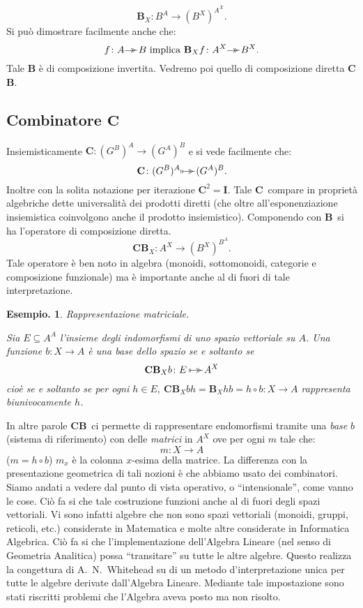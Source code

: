 \documentclass{book}
\newtheorem{esempio}{Esempio.}
\newcommand*{\CC}{$\mathbf{C}$}    %
\newcommand*{\BB}{$\mathbf{B}$}    %
\newcommand*{\ii}{\mathbf{I}}    %
\newcommand*{\cc}{\mathbf{C}}    %
\newcommand*{\bb}{\mathbf{B}}    %
\def\ddp{\hbox{\kern-.5em\lower.63ex\hbox{${}^\succ$}}}
\def\bijection{\mbox{$\mapstochar\,\mapsto\ddp$}}
\def\surjection{\mbox{$\to\ddp$}}
\begin{document}
\[
\bb_X \colon B^A \to (B^X)^{A^X}.
\]
Si pu\`o dimostrare facilmente anche che:
\[
f \colon A \surjection B \text{ implica } \bb_X f \colon A^X \surjection B^X.
\]
Tale $\bb$ \`e di composizione invertita. Vedremo poi quello di composizione
diretta \CC\BB.

\subsection{Combinatore \CC}
Insiemisticamente $\cc \colon (G^B)^{A} \to (G^A)^B$ e si 
vede facilmente che:
\[
\cc \colon (G^B)^{A} \bijection (G^A)^B.
\] 
Inoltre con la solita
notazione per iterazione $\cc^2 = \ii$. Tale \CC~compare in propriet\`a
algebriche dette universalit\`a dei prodotti diretti (che oltre 
all'esponenziazione insiemistica coinvolgono anche il prodotto insiemistico).
Componendo con \BB~si ha l'operatore di composizione diretta.
\[
\cc\bb_X \colon A^X \to (B^X)^{B^A}.
\]
Tale operatore \`e ben noto in algebra (monoidi, sottomonoidi, categorie e
composizione funzionale) ma \`e importante anche al di fuori di tale 
interpretazione.

\begin{esempio}
Rappresentazione matriciale.

Sia $E \subseteq A^A$ l'insieme degli indomorfismi di uno spazio vettoriale su 
$A$. Una funzione  $b \colon X \to A$ \`e una base dello spazio se e soltanto 
se
\[
\cc\bb_Xb \colon E\, \bijection A^X
\]
cio\`e se e soltanto se per ogni $h \in E, \ \cc\bb_Xbh = \bb_Xhb = h \circ b 
\colon X \to A$ rappresenta biunivocamente $h$.
\end{esempio}
In altre parole \CC\BB~ci permette di rappresentare endomorfismi tramite una 
\emph{base} $b$ (sistema di riferimento) con delle \emph{matrici} in $A^X$ ove
per ogni $m$ tale che:
\[m \colon X \to A\]
 ($m = h \circ b$) $m_x$ \`e la
colonna $x$-esima della matrice.
La differenza con la presentazione geometrica di tali nozioni \`e che abbiamo 
usato dei combinatori. Siamo andati a vedere dal punto di vista operativo, o
``intensionale'', come vanno le cose. Ci\`o fa si che tale costruzione funzioni
anche al di fuori degli spazi vettoriali.
Vi sono infatti algebre che non sono spazi vettoriali (monoidi, gruppi, 
reticoli, etc.) considerate in Matematica e molte altre considerate in
Informatica Algebrica.
Ci\`o fa si che l'implementazione  dell'Algebra Lineare  (nel senso di 
Geometria Analitica) possa ``transitare'' su tutte le altre algebre. Questo
realizza la congettura di A.~N.~Whitehead su di un metodo d'interpretazione 
unica per tutte le algebre derivate dall'Algebra Lineare.
Mediante tale impostazione sono stati riscritti problemi che l'Algebra aveva 
posto ma non risolto.
\end{document}
